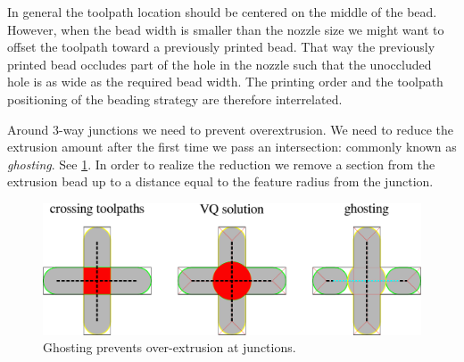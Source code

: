 In general the toolpath location should be centered on the middle of the bead.
However, when the bead width is smaller than the nozzle size we might want to offset the toolpath toward a previously printed bead.
That way the previously printed bead occludes part of the hole in the nozzle such that the unoccluded hole is as wide as the required bead width.
The printing order and the toolpath positioning of the beading strategy are therefore interrelated.

Around 3-way junctions we need to prevent overextrusion.
We need to reduce the extrusion amount after the first time we pass an intersection: commonly known as \emph{ghosting}.
See \cref{ghosting}.
In order to realize the reduction we remove a section from the extrusion bead up to a distance equal to the feature radius from the junction.


\begin{figure}
\centering
\includegraphics[width=.99\columnwidth]{sources/method/ghosting.pdf}
\caption{Ghosting prevents over-extrusion at junctions.}
\label{ghosting}
\end{figure}




